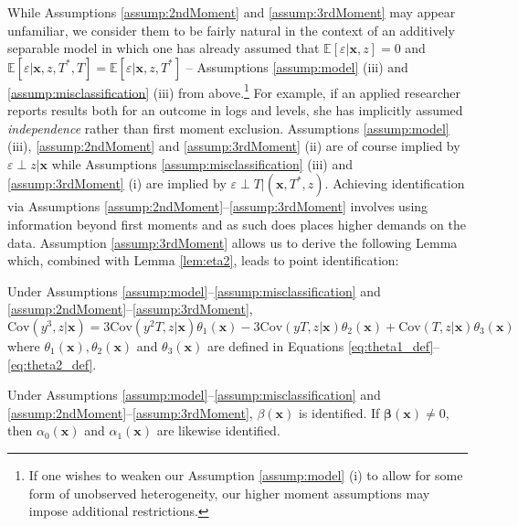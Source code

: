 While Assumptions \ref{assump:2ndMoment} and \ref{assump:3rdMoment} may appear unfamiliar, we consider them to be fairly natural in the context of an additively separable model in which one has already assumed that $\mathbb{E}[\varepsilon|\mathbf{x},z]=0$ and $\mathbb{E}[\varepsilon|\mathbf{x},z,T^*,T] = \mathbb{E}[\varepsilon|\mathbf{x},z,T^*]$ -- Assumptions \ref{assump:model} (iii) and \ref{assump:misclassification} (iii) from above.\footnote{If one wishes to weaken our Assumption \ref{assump:model} (i) to allow for some form of unobserved heterogeneity, our higher moment assumptions may impose additional restrictions.}
For example, if an applied researcher reports results both for an outcome in logs and levels, she has implicitly assumed \emph{independence} rather than first moment exclusion. 
Assumptions \ref{assump:model} (iii), \ref{assump:2ndMoment} and \ref{assump:3rdMoment} (ii) are of course implied by $\varepsilon \perp z |\mathbf{x}$ while Assumptions \ref{assump:misclassification} (iii) and \ref{assump:3rdMoment} (i) are implied by $\varepsilon\perp T | (\mathbf{x}, T^*, z)$.
Achieving identification via Assumptions \ref{assump:2ndMoment}--\ref{assump:3rdMoment} involves using information beyond first moments and as such does places higher demands on the data.
Assumption \ref{assump:3rdMoment} allows us to derive the following Lemma which, combined with Lemma \ref{lem:eta2}, leads to point identification: 

\begin{lem}
  Under Assumptions \ref{assump:model}--\ref{assump:misclassification} and \ref{assump:2ndMoment}--\ref{assump:3rdMoment}, 
\[
    \mbox{Cov}(y^3,z|\mathbf{x}) = 3 \mbox{Cov}(y^2T,z|\mathbf{x}) \theta_1(\mathbf{x}) -3\mbox{Cov}(yT,z|\mathbf{x}) \theta_2(\mathbf{x}) + \mbox{Cov}(T,z|\mathbf{x}) \theta_3(\mathbf{x})
\]
where $\theta_1(\mathbf{x}),\theta_2(\mathbf{x})$ and $\theta_3(\mathbf{x})$ are defined in Equations \ref{eq:theta1_def}--\ref{eq:theta2_def}.
\label{lem:eta3}
\end{lem}

\begin{thm}
  Under Assumptions \ref{assump:model}--\ref{assump:misclassification} and \ref{assump:2ndMoment}--\ref{assump:3rdMoment}, $\beta(\mathbf{x})$ is identified.
  If $\mathbf{\beta}(\mathbf{x}) \neq 0$, then $\alpha_0(\mathbf{x})$ and $\alpha_1(\mathbf{x})$ are likewise identified.
  \label{thm:main_ident}
\end{thm}

